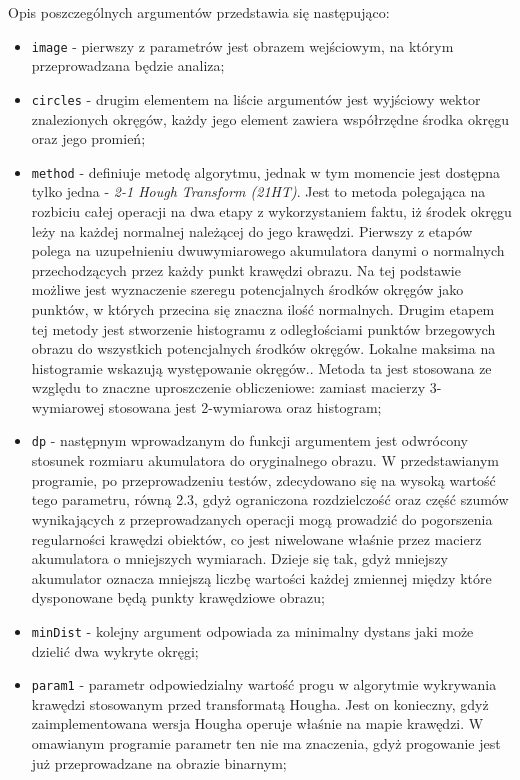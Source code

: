 Opis poszczególnych argumentów przedstawia się następująco:
\begin{itemize}
\item \texttt{image} - pierwszy z parametrów jest obrazem wejściowym, na którym przeprowadzana będzie analiza;
\item \texttt{circles} - drugim elementem na liście argumentów jest wyjściowy wektor znalezionych okręgów, każdy jego element zawiera współrzędne środka okręgu oraz jego promień;
\item \texttt{method} - definiuje metodę algorytmu, jednak w tym momencie jest dostępna tylko jedna - \textit{2-1 Hough Transform (21HT)}. Jest to metoda polegająca na rozbiciu całej operacji na dwa etapy z wykorzystaniem faktu, iż środek okręgu leży na każdej normalnej należącej do jego krawędzi. Pierwszy z etapów polega na uzupełnieniu dwuwymiarowego akumulatora danymi o normalnych przechodzących przez każdy punkt krawędzi obrazu. Na tej podstawie możliwe jest wyznaczenie szeregu potencjalnych środków okręgów jako punktów, w których przecina się znaczna ilość normalnych. Drugim etapem tej metody jest stworzenie histogramu z odległościami punktów brzegowych obrazu do wszystkich potencjalnych środków okręgów. Lokalne maksima na histogramie wskazują występowanie okręgów.\cite{Yuen}. Metoda ta jest stosowana ze względu to znaczne uproszczenie obliczeniowe: zamiast macierzy 3-wymiarowej stosowana jest 2-wymiarowa oraz histogram;
\item \texttt{dp} - następnym wprowadzanym do funkcji argumentem jest odwrócony stosunek rozmiaru akumulatora do oryginalnego obrazu. W przedstawianym programie, po przeprowadzeniu testów, zdecydowano się na wysoką wartość tego parametru, równą 2.3, gdyż ograniczona rozdzielczość oraz część szumów wynikających z przeprowadzanych operacji mogą prowadzić do pogorszenia regularności krawędzi obiektów, co jest niwelowane właśnie przez macierz akumulatora o mniejszych wymiarach. Dzieje się tak, gdyż mniejszy akumulator oznacza mniejszą liczbę wartości każdej zmiennej między które dysponowane będą punkty krawędziowe obrazu;
\item \texttt{minDist} - kolejny argument odpowiada za minimalny dystans jaki może dzielić dwa wykryte okręgi;
\item \texttt{param1} - parametr odpowiedzialny wartość progu w algorytmie wykrywania krawędzi stosowanym przed transformatą Hougha. Jest on konieczny, gdyż zaimplementowana wersja Hougha operuje właśnie na mapie krawędzi. W omawianym programie parametr ten nie ma znaczenia, gdyż progowanie jest już przeprowadzane na obrazie binarnym;

\end{itemize}
